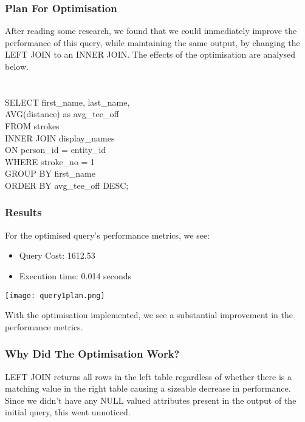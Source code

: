 \documentclass[titlepage]{article}
\begin{document}
\subsubsection{Plan For Optimisation}
After reading some research, we found that we could immediately improve the performance of this query,
while maintaining the same output, by changing the LEFT JOIN to an INNER JOIN. The effects of the 
optimisation are analysed below. \\ \\ \\
\hspace{15pt}SELECT first\_name, last\_name, \\
\hspace{15pt}AVG(distance) as avg\_tee\_off \\
\hspace{15pt}FROM strokes \\
\hspace{15pt}INNER JOIN display\_names \\
\hspace{15pt}ON person\_id = entity\_id \\
\hspace{15pt}WHERE stroke\_no = 1 \\
\hspace{15pt}GROUP BY first\_name \\
\hspace{15pt}ORDER BY avg\_tee\_off DESC; \\
\vspace{1em}
\subsubsection{Results}
\vspace{1em}
For the optimised query's performance metrics, we see:
\begin{itemize}
  \item Query Cost: 1612.53
  \item Execution time: 0.014 seconds
\end{itemize}
\begin{center}
  \texttt{[image: query1plan.png]}
\end{center}
\vspace{1em}
With the optimisation implemented, we see a substantial improvement in the performance metrics.
\vspace{1em}
\subsubsection{Why Did The Optimisation Work?}
LEFT JOIN returns all rows in the left table regardless of whether there is a matching value in the right
table causing a sizeable decrease in performance. Since we didn't have any NULL valued attributes
present in the output of the initial query, this went unnoticed.\\
\end{document}

